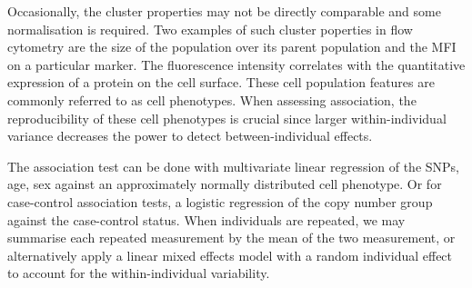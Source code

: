 %
%
%
%
%

Occasionally, the cluster properties may not be directly comparable and some normalisation is required.
Two examples of such cluster poperties in flow cytometry are the size of the population over its parent population and the \gls{MFI} on a particular marker.
The fluorescence intensity correlates with the quantitative expression of a protein on the cell surface.
These cell population features are commonly referred to as cell phenotypes.  
When assessing association, the reproducibility of these cell phenotypes is crucial since
larger within-individual variance decreases the power to detect between-individual effects.

The association test can be done with multivariate linear regression of the SNPs, age, sex against an approximately normally distributed cell phenotype.
Or for case-control association tests, a logistic regression of the copy number group against the case-control status.
When individuals are repeated, we may summarise each repeated measurement by the mean of the two measurement, or
alternatively apply a linear mixed effects model with a random individual effect to account for the within-individual variability.


